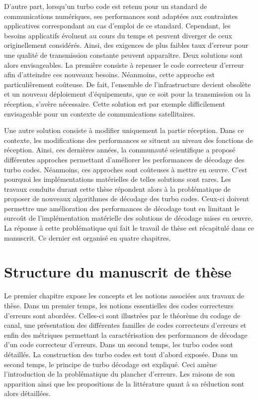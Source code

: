 D'autre part, lorsqu'un turbo code est retenu pour un standard de communications numériques, ses performances sont adaptées aux
contraintes applicatives correspondant au cas d'emploi de ce standard. Cependant, les besoins applicatifs évoluent au cours du temps et peuvent diverger de ceux originellement considérés. Ainsi, des exigences de plus faibles taux 
d'erreur pour une qualité de transmission constante peuvent apparaître. Deux solutions sont alors envisageables. La première
consiste à repenser le code correcteur d'erreur afin d'atteindre ces nouveaux besoins. Néanmoins, cette approche est 
particulièrement coûteuse. De fait, l'ensemble de l’infrastructure devient obsolète et un nouveau déploiement 
d'équipements, que ce soit pour la transmission ou la réception, s'avère nécessaire. Cette solution est par exemple 
difficilement envisageable pour un contexte de communications satellitaires.

Une autre solution consiste à modifier uniquement la partie réception. Dans ce contexte, les modifications des performances 
se situent au niveau des fonctions de réception. Ainsi, ces dernières années, la communauté scientifique a proposé différentes 
approches permettant d'améliorer les performances de décodage des turbo codes. Néanmoins, ces approches sont coûteuses
à mettre en œuvre. C'est pourquoi les implémentations matérielles de telles solutions sont rares. Les travaux conduits 
durant cette thèse répondent alors à la problématique de proposer de nouveaux algorithmes de décodage des
turbo codes. Ceux-ci doivent permettre une amélioration des performances de décodage tout en limitant le surcoût de l'implémentation matérielle 
des solutions de décodage mises en œuvre.
 La réponse à cette problématique qui fait le travail de thèse est récapitulé dans ce manuscrit. Ce dernier est organisé 
 en quatre chapitres.

\section*{Structure du manuscrit de thèse}
Le premier chapitre expose les concepts et les notions associées aux travaux de thèse. Dans un premier temps, les notions 
essentielles des codes correcteurs d'erreurs sont abordées. Celles-ci sont illustrées par le théorème du codage de 
canal, une présentation des différentes familles de codes correcteurs d'erreurs et enfin des métriques permettant la 
caractérisation des performances de décodage d'un code correcteur d'erreurs. Dans un second temps, les turbo codes sont détaillés.
La construction des turbo codes est tout d'abord exposée. Dans un second temps, le principe de turbo décodage est expliqué. Ceci amène 
l'introduction de la problématique du plancher d'erreurs. Les raisons de son 
apparition ainsi que les propositions de la littérature quant à sa réduction sont alors détaillées.

